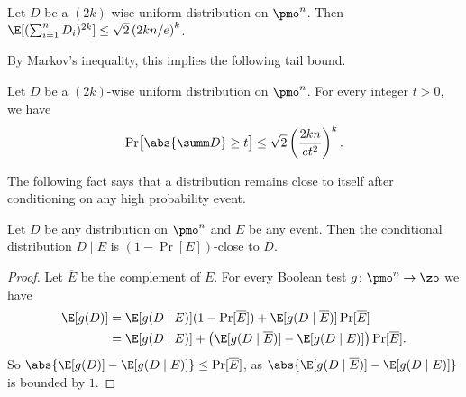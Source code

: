 \begin{lemma} \label{lemma:moment}
  Let $D$ be a $(2k)$-wise uniform distribution on $\pmo^n$.
  Then $\E[ (\sum_{i=1}^n D_i)^{2k} ] \le \sqrt{2} \left(2kn/e\right)^k$.
\end{lemma}

By Markov's inequality, this implies the following tail bound.

\begin{corollary} \label{cor:tail-bound}
  Let $D$ be a $(2k)$-wise uniform distribution on $\pmo^n$.
  For every integer $t > 0$, we have
  \[
  \Pr\bigl[ \abs{\summ D} \ge t \bigr]
    \le \sqrt{2} \left(\frac{2kn}{e t^2}\right)^k .
  \]
\end{corollary}

The following fact says that a distribution remains close to itself after conditioning on any high probability event.

\begin{fact} \label{fact:tvd-conditioning}
  Let $D$ be any distribution on $\pmo^n$ and $E$ be any event.
  Then the conditional distribution $D \mid E$ is $(1 - \Pr[E])$-close to $D$.
\end{fact}

\begin{proof}
  Let $\overline{E}$ be the complement of $E$.
  For every Boolean test $g\colon\pmo^n \to \zo$ we have
  \begin{align*}
    \E[g(D)]
    &= \E[g(D \mid E)] (1 - \Pr[\overline{E}]) + \E[g(D \mid \overline{E})] \Pr[\overline{E}] \\
    &= \E[g(D\mid E)] + \bigl( \E[g(D \mid \overline{E})] - \E[g(D \mid E)] \bigr) \Pr[\overline{E}] .
  \end{align*}
So $\abs{\E[g(D)] - \E[g(D \mid E)]} \le \Pr[\overline{E}]$, as $\abs{\E[g(D \mid \overline{E})] - \E[g(D \mid E)]}$ is bounded by $1$.
\end{proof}

